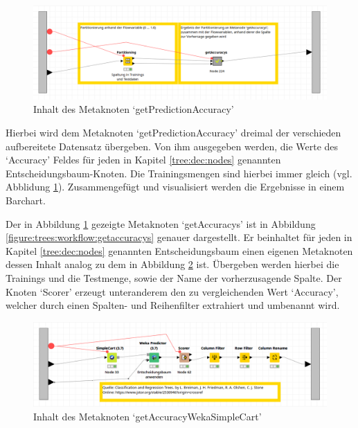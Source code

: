 \documentclass[12pt,					%
							 oneside,			%
							 a4paper,			%
							 halfparskip,		%
							 liststotoc,			%
							 bibtotoc,			%
							 fleqn,				%
							 pointlessnumbers]	%
							 {scrreprt}
\begin{document}
		\begin{figure}[h]
			\begin{center}
				\includegraphics[scale=0.35]{pictures/trees-workflow-partitioning.png}
				\caption{Inhalt des Metaknoten `getPredictionAccuracy'}									
				\label{figure:trees:workflow:partitioning}
			\end{center}
		\end{figure}
		
		Hierbei wird dem Metaknoten `getPredictionAccuracy' dreimal der verschieden aufbereitete Datensatz übergeben. Von ihm ausgegeben werden, die Werte des `Accuracy' Feldes für jeden in Kapitel \ref{tree:dec:nodes} genannten Entscheidungsbaum-Knoten. Die Trainingsmengen sind hierbei immer gleich (vgl. Abblidung \ref{figure:trees:workflow:partitioning}). Zusammengefügt und visualisiert werden die Ergebnisse in einem Barchart.
		
		Der in Abbildung \ref{figure:trees:workflow:partitioning}	 gezeigte Metaknoten `getAccuracys' ist in Abbildung \ref{figure:trees:workflow:getaccuracys} genauer dargestellt. Er beinhaltet für jeden in Kapitel \ref{tree:dec:nodes} genannten Entscheidungsbaum einen eigenen Metaknoten dessen Inhalt analog zu dem in Abbildung \ref{figure:trees:workflow:example:weka} ist. Übergeben werden hierbei die Trainings und die Testmenge, sowie der Name der vorherzusagende Spalte. Der Knoten `Scorer' erzeugt unteranderem den zu vergleichenden Wert `Accuracy', welcher durch einen Spalten- und Reihenfilter extrahiert und umbenannt wird.
		
		\begin{figure}[h]
			\begin{center}
				\includegraphics[scale=0.35]{pictures/trees-workflow-weka-example.png}
				\caption{Inhalt des Metaknoten `getAccuracyWekaSimpleCart'}									
				\label{figure:trees:workflow:example:weka}
			\end{center}
		\end{figure}
		
\end{document}
